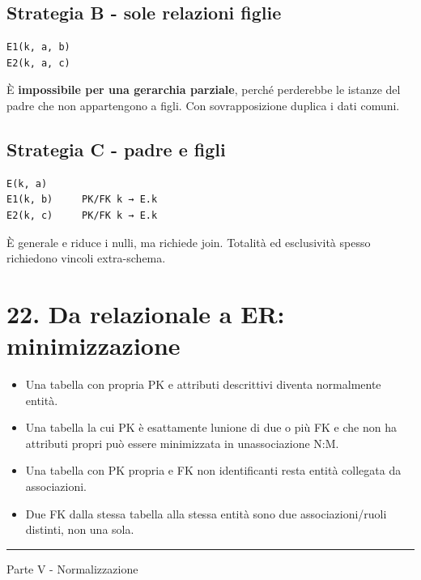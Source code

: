 \documentclass[
  10pt,
  a4paper,
]{article}
\providecommand{\tightlist}{%
  \setlength{\itemsep}{0pt}\setlength{\parskip}{0pt}}
\begin{document}
\subsection{Strategia B - sole relazioni
figlie}\label{strategia-b---sole-relazioni-figlie}

\begin{verbatim}
E1(k, a, b)
E2(k, a, c)
\end{verbatim}

È \textbf{impossibile per una gerarchia parziale}, perché perderebbe le
istanze del padre che non appartengono a figli. Con sovrapposizione
duplica i dati comuni.

\subsection{Strategia C - padre e
figli}\label{strategia-c---padre-e-figli}

\begin{verbatim}
E(k, a)
E1(k, b)     PK/FK k → E.k
E2(k, c)     PK/FK k → E.k
\end{verbatim}

È generale e riduce i nulli, ma richiede join. Totalità ed esclusività
spesso richiedono vincoli extra-schema.

\section{22. Da relazionale a ER:
minimizzazione}\label{22-da-relazionale-a-er-minimizzazione}

\begin{itemize}
\tightlist
\item
  Una tabella con propria PK e attributi descrittivi diventa normalmente
  entità.
\item
  Una tabella la cui PK è esattamente l\textquotesingle unione di due o
  più FK e che non ha attributi propri può essere minimizzata in
  un\textquotesingle associazione N:M.
\item
  Una tabella con PK propria e FK non identificanti resta entità
  collegata da associazioni.
\item
  Due FK dalla stessa tabella alla stessa entità sono due
  associazioni/ruoli distinti, non una sola.
\end{itemize}

\begin{center}\rule{0.5\linewidth}{0.5pt}\end{center}

Parte V - Normalizzazione
\end{document}
